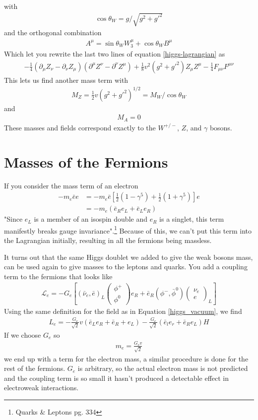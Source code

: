 with 
\begin{align}
\cos\theta_W = g/\sqrt{g^2+g'^2}
\end{align}
and the orthogonal combination
\begin{align}
A^\mu = \sin\theta_W W_3^\mu + \cos\theta_W B^\mu
\end{align}
Which let you rewrite the last two lines of equation \ref{higgs-lagrangian} as
\begin{align}
-\frac{1}{4}(\partial_\mu Z_\nu - \partial_\nu Z_\mu)(\partial^\mu Z^\nu -\partial^\nu Z^\mu) + \frac{1}{8}v^2(g^2 + g'^2)Z_\mu Z^\mu - \frac{1}{4}F_{\mu\nu}F^{\mu\nu}
\end{align}
This lets us find another mass term with
\begin{align}
M_Z = \frac{1}{2}v(g^2+g'^2)^{1/2} = M_W/\cos\theta_W
\end{align}
and
\begin{align}
M_A = 0
\end{align}
These masses and fields correspond exactly to the $W^{+/-}$, $Z$, and $\gamma$ bosons.
\section{Masses of the Fermions}
 If you consider the mass term of an electron
\begin{align}
-m_e\bar{e}e &= -m_e\bar{e}[\frac{1}{2}(1-\gamma^5)+\frac{1}{2}(1+\gamma^5)]e\\&= -m_e(\bar{e}_R e_L + \bar{e}_L e_R)
\end{align}
"Since $e_L$ is a member of an isospin double and $e_R$ is a singlet, this term manifestly breaks gauge invariance".\footnote{Quarks \& Leptons pg. 334} Because of this, we can't put this term into the Lagrangian initially, resulting in all the fermions being massless.

It turns out that the same Higgs doublet we added to give the weak bosons mass, can be used again to give masses to the leptons and quarks. You add a coupling term to the fermions that looks like
\begin{align}
\mathcal{L}_e = -G_e\left[ (\bar{\nu}_e,\bar{e})_L\begin{pmatrix}
\phi^+\\
\phi^0
\end{pmatrix}e_R + \bar{e}_R(\phi^-,\bar{\phi}^0)\begin{pmatrix}
\nu_e\\
e
\end{pmatrix}_L\right]
\end{align}
Using the same definition for the field as in Equation \ref{higgs_vacuum}, we find
\begin{align}
L_e = -\frac{G_e}{\sqrt{2}}v(\bar{e}_Le_R+\bar{e}_R+e_L) -\frac{G_e}{\sqrt{2}}(\bar{e}_le_r+\bar{e}_Re_L)H
\end{align}
If we choose $G_e$ so
\begin{align}
m_e = \frac{G_ev}{\sqrt{2}}
\end{align}
we end up with a term for the electron mass, a similar procedure is done for the rest of the fermions. $G_e$ is arbitrary, so the actual electron mass is not predicted and the coupling term is so small it hasn't produced a detectable effect in electroweak interactions.

